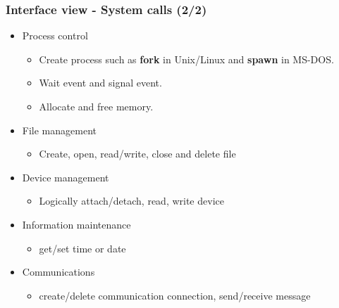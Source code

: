\documentclass[CJKutf8,dvipsnames,table]{beamer}
\begin{document}
\begin{CJK*}{UTF8}{song}
  \begin{frame}
    \frametitle{Interface view - System calls (2/2)} \pause
    \begin{itemize}
    \item Process control  \pause
      \begin{itemize}
      \item Create process such as \textbf{fork} in Unix/Linux and \textbf{spawn} in MS-DOS.  \pause
      \item Wait event and signal event.  \pause
      \item Allocate and free memory.  \pause
      \end{itemize}
    \item File management  \pause
      \begin{itemize}
      \item Create, open, read/write, close and delete file  \pause
      \end{itemize}
    \item Device management  \pause
      \begin{itemize}
      \item Logically attach/detach, read, write device  \pause
      \end{itemize}
    \item Information maintenance  \pause
      \begin{itemize}
      \item get/set time or date  \pause
      \end{itemize}
    \item Communications  \pause
      \begin{itemize}
      \item create/delete communication connection, send/receive message 
      \end{itemize}
    \end{itemize}
  \end{frame}


\end{CJK*}
\end{document}
